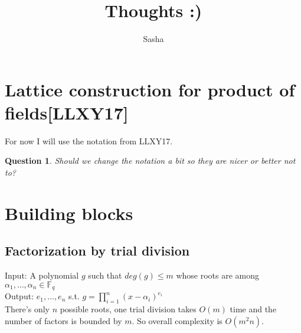 \documentclass[12pt]{article}
\title{Thoughts :)}
\author{ Sasha }
\newtheorem{question}{Question}
\begin{document}
\maketitle

\section{Lattice construction for product of fields[LLXY17]}
For now I will use the notation from LLXY17. 
\begin{question}
Should we change the notation a bit so they are nicer or better not to?
\end{question}

\section{Building blocks}
\subsection{Factorization by trial division}
Input: A polynomial $g$ such that $deg(g) \leq m$ whose roots are among $\alpha_1, \dots , \alpha_n \in \mathbb{F}_q$\\
Output: $e_1, \dots , e_n$ s.t. $g = \prod_{i = 1}^{n}(x - \alpha_i)^{e_i}$\\
There's only $n$ possible roots, one trial division takes $O(m)$ time and the number of factors is bounded by $m$. So overall complexity is $O(m^2n)$.
\end{document}
